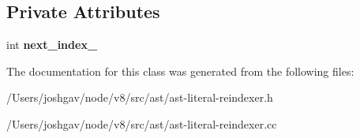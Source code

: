 \subsection*{Private Attributes}
\begin{DoxyCompactItemize}
\item 
int {\bfseries next\+\_\+index\+\_\+}\hypertarget{classv8_1_1internal_1_1_ast_literal_reindexer_ad4f3c6808d7eb49b82f1e6ca23d0e2a4}{}\label{classv8_1_1internal_1_1_ast_literal_reindexer_ad4f3c6808d7eb49b82f1e6ca23d0e2a4}

\end{DoxyCompactItemize}


The documentation for this class was generated from the following files\+:\begin{DoxyCompactItemize}
\item 
/\+Users/joshgav/node/v8/src/ast/ast-\/literal-\/reindexer.\+h\item 
/\+Users/joshgav/node/v8/src/ast/ast-\/literal-\/reindexer.\+cc\end{DoxyCompactItemize}

